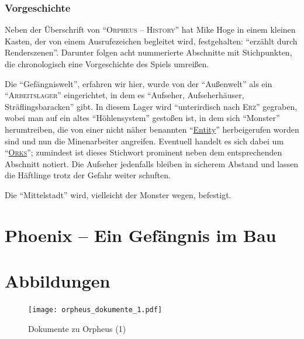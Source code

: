 \documentclass[a5paper,pagesize,numbers=noenddot]{scrbook}
\begin{document}
\subsection{Vorgeschichte}\label{sec:orpheus_geschichte_vorgeschichte}
Neben der Überschrift von \enquote{\textsc{Orpheus -- History}} hat Mike Hoge in einem kleinen Kasten, der von einem Ausrufezeichen begleitet wird, festgehalten:
\enquote{erzählt durch Renderszenen}.
Darunter folgen acht nummerierte Abschnitte mit Stichpunkten, die chronologisch eine Vorgeschichte des Spiels umreißen.

Die \enquote{Gefängniswelt}, erfahren wir hier, wurde von der \enquote{Außenwelt} als ein \enquote{\textsc{Arbeitslager}} eingerichtet, in dem es \enquote{Aufseher, Aufseherhäuser, Sträflingsbaracken} gibt.
In diesem Lager wird \enquote{unterirdisch nach \textsc{Erz}} gegraben, wobei man auf ein altes \enquote{Höhlensystem} gestoßen ist, in dem sich \enquote{Monster} herumtreiben, die von einer nicht näher benannten \enquote{\uline{Entity}} herbeigerufen worden sind und nun die Minenarbeiter angreifen.
Eventuell handelt es sich dabei um \enquote{\textsc{\uline{Orks}}}; zumindest ist dieses Stichwort prominent neben dem entsprechenden Abschnitt notiert.
Die Aufseher jedenfalls bleiben in sicherem Abstand und lassen die Häftlinge trotz der Gefahr weiter schuften.

Die \enquote{Mittelstadt} wird, vielleicht der Monster wegen, befestigt.


\chapter{Phoenix -- Ein Gefängnis im Bau}\label{ch:phoenix}


\clearpage
{}
\printbibliography


\clearpage
{}
\appendix
\renewcommand{\thefigure}{\arabic{figure}}

\chapter{Abbildungen}\label{ch:anhang_abbildungen}
\begin{figure}
   \centering
   \texttt{[image: orpheus\_dokumente\_1.pdf]}
   \caption{Dokumente zu Orpheus (1)}
   \label{fig:orpheus_dokumente_1}
\end{figure}
\end{document}
